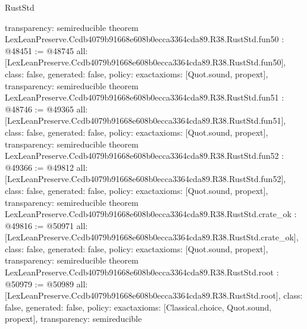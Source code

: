 \begin{lexlean}{RustStd}
\begin{coremodule}
{  transparency: semireducible
}
theorem LexLeanPreserve.Ccdb4079b91668e608b0ecca3364cda89.R38.RustStd.fun50 : @48451 := @48745 {
  all: [LexLeanPreserve.Ccdb4079b91668e608b0ecca3364cda89.R38.RustStd.fun50],
  class: false,
  generated: false,
  policy: exact{axioms: [Quot.sound, propext]},
  transparency: semireducible
}
theorem LexLeanPreserve.Ccdb4079b91668e608b0ecca3364cda89.R38.RustStd.fun51 : @48746 := @49365 {
  all: [LexLeanPreserve.Ccdb4079b91668e608b0ecca3364cda89.R38.RustStd.fun51],
  class: false,
  generated: false,
  policy: exact{axioms: [Quot.sound, propext]},
  transparency: semireducible
}
theorem LexLeanPreserve.Ccdb4079b91668e608b0ecca3364cda89.R38.RustStd.fun52 : @49366 := @49812 {
  all: [LexLeanPreserve.Ccdb4079b91668e608b0ecca3364cda89.R38.RustStd.fun52],
  class: false,
  generated: false,
  policy: exact{axioms: [Quot.sound, propext]},
  transparency: semireducible
}
theorem LexLeanPreserve.Ccdb4079b91668e608b0ecca3364cda89.R38.RustStd.crate_ok : @49816 := @50971 {
  all: [LexLeanPreserve.Ccdb4079b91668e608b0ecca3364cda89.R38.RustStd.crate_ok],
  class: false,
  generated: false,
  policy: exact{axioms: [Quot.sound, propext]},
  transparency: semireducible
}
theorem LexLeanPreserve.Ccdb4079b91668e608b0ecca3364cda89.R38.RustStd.root : @50979 := @50989 {
  all: [LexLeanPreserve.Ccdb4079b91668e608b0ecca3364cda89.R38.RustStd.root],
  class: false,
  generated: false,
  policy: exact{axioms: [Classical.choice, Quot.sound, propext]},
  transparency: semireducible
}


\end{coremodule}
\end{lexlean}
